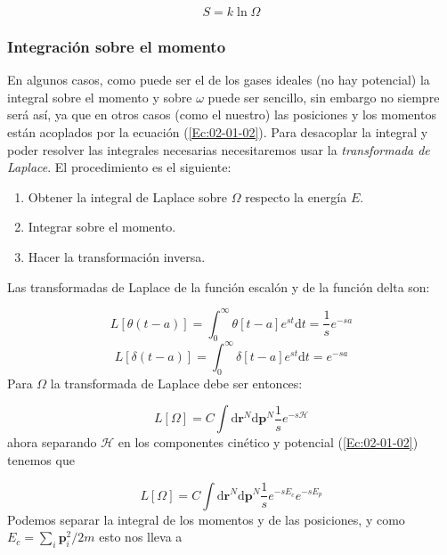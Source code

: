 \documentclass[11pt]{article} %
\newcommand{\D}{\mathrm{d}}
\newcommand{\Hcal}{\mathcal{H}}
\newcommand{\pn}{\mathbf{p}}
\newcommand{\rn}{\mathbf{r}}
\begin{document}
\begin{equation}
	S=k \ln \Omega \label{Ec:02-01-05}
\end{equation}

\subsubsection{Integración sobre el momento}

En algunos casos, como puede ser el de los gases ideales (no hay potencial) la integral sobre el momento y sobre $\omega$ puede ser sencillo, sin embargo no siempre será así, ya que en otros casos (como el nuestro) las posiciones y los momentos están acoplados por la ecuación (\ref{Ec:02-01-02}). Para desacoplar la integral y poder resolver las integrales necesarias necesitaremos usar la \textit{transformada de Laplace}. El procedimiento es el siguiente:

\begin{enumerate}
	\item Obtener la integral de Laplace sobre $\Omega$ respecto la energía $E$.
	\item Integrar sobre el momento.
	\item Hacer la transformación inversa.
\end{enumerate}

Las transformadas de Laplace de la función escalón y de la función delta son:

\begin{equation}
	L[\theta(t-a)] = \int_{0}^{\infty} \theta [t-a] e^{st} \D t = \frac{1}{s} e^{-sa}
\end{equation}
\begin{equation}
	L[\delta(t-a)] = \int_{0}^{\infty} \delta [t-a] e^{st} \D t =e^{-sa} 
\end{equation}
Para $\Omega$ la transformada de Laplace debe ser entonces:

\begin{equation}
	L[\Omega] = C \int \D \rn^N \D \pn^N \frac{1}{s} e^{-s\Hcal} 
\end{equation}
ahora separando $\Hcal$ en los componentes cinético y potencial (\ref{Ec:02-01-02}) tenemos que

\begin{equation}
	L[\Omega] = C \int \D \rn^N \D \pn^N \frac{1}{s} e^{-sE_c}e^{-sE_p} \label{Ec:02-01-09}
\end{equation}
Podemos separar la integral de los momentos y de las posiciones, y como $E_c=\sum_i \pn_i^2/2m$ esto nos lleva a 
\end{document}
